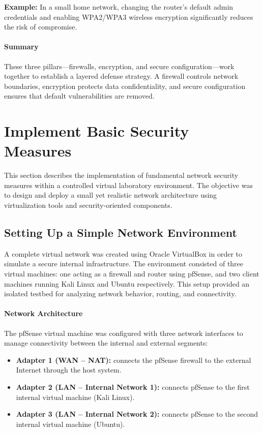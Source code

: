 \documentclass[12pt,a4paper]{report}
\begin{document}
\textbf{Example:} In a small home network, changing the router’s default admin credentials and enabling WPA2/WPA3 wireless encryption 
significantly reduces the risk of compromise.

\paragraph{Summary}
These three pillars—firewalls, encryption, and secure configuration—work together to establish 
a layered defense strategy. A firewall controls network boundaries, encryption protects data 
confidentiality, and secure configuration ensures that default vulnerabilities are removed.



    \section{Implement Basic Security Measures}

This section describes the implementation of fundamental network security measures
within a controlled virtual laboratory environment. The objective was to design and deploy
a small yet realistic network architecture using virtualization tools and security-oriented components.

\subsection{ Setting Up a Simple Network Environment}

A complete virtual network was created using Oracle VirtualBox in order to simulate a secure internal infrastructure.
The environment consisted of three virtual machines: one acting as a firewall and router using pfSense,
and two client machines running Kali Linux and Ubuntu respectively. This setup provided an isolated testbed
for analyzing network behavior, routing, and connectivity.

\paragraph{Network Architecture}

The pfSense virtual machine was configured with three network interfaces to manage connectivity between the internal
and external segments:

\begin{itemize}
    \item \textbf{Adapter 1 (WAN – NAT):} connects the pfSense firewall to the external Internet through the host system.
    \item \textbf{Adapter 2 (LAN – Internal Network 1):} connects pfSense to the first internal virtual machine (Kali Linux).
    \item \textbf{Adapter 3 (LAN – Internal Network 2):} connects pfSense to the second internal virtual machine (Ubuntu).
\end{itemize}
\end{document}
